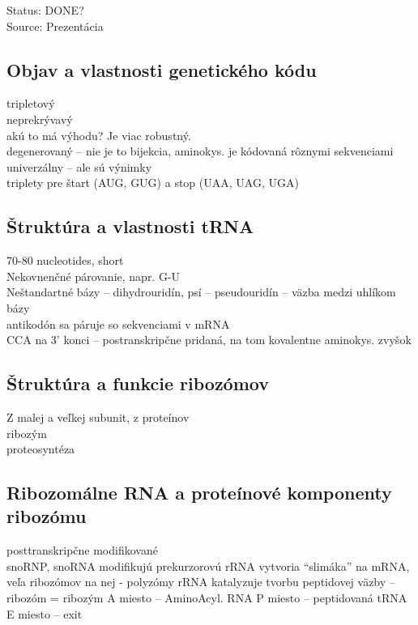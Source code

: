 Status: DONE?\\
Source: Prezentácia \\

\subsection{Objav a vlastnosti genetického kódu}
tripletový\\
neprekrývavý\\
\tab akú to má výhodu? Je viac robustný. \\
degenerovaný -- nie je to bijekcia, aminokys. je kódovaná rôznymi sekvenciami\\
univerzálny -- ale sú výnimky\\
triplety pre štart (AUG, GUG) a stop (UAA, UAG, UGA)\\

\subsection{Štruktúra a vlastnosti tRNA}
70-80 nucleotides, short\\
Nekovnenčné párovanie, napr. G-U\\
Neštandartné bázy -- dihydrouridín, psí -- pseudouridín -- väzba medzi uhlíkom bázy\\
antikodón sa páruje so sekvenciami v mRNA\\
CCA na 3' konci -- postranskripčne pridaná, na tom kovalentne aminokys. zvyšok\\
\subsection{Štruktúra a funkcie ribozómov}
Z malej a veľkej subunit, z proteínov\\
ribozým\\
proteosyntéza\\
\subsection{Ribozomálne RNA a proteínové komponenty ribozómu}
posttranskripčne modifikované\\
snoRNP, snoRNA modifikujú prekurzorovú rRNA
vytvoria “slimáka” na mRNA, veľa ribozómov na nej - polyzómy
rRNA katalyzuje tvorbu peptidovej väzby -- ribozóm = ribozým
A miesto -- AminoAcyl. RNA
P miesto -- peptidovaná tRNA
E miesto -- exit

